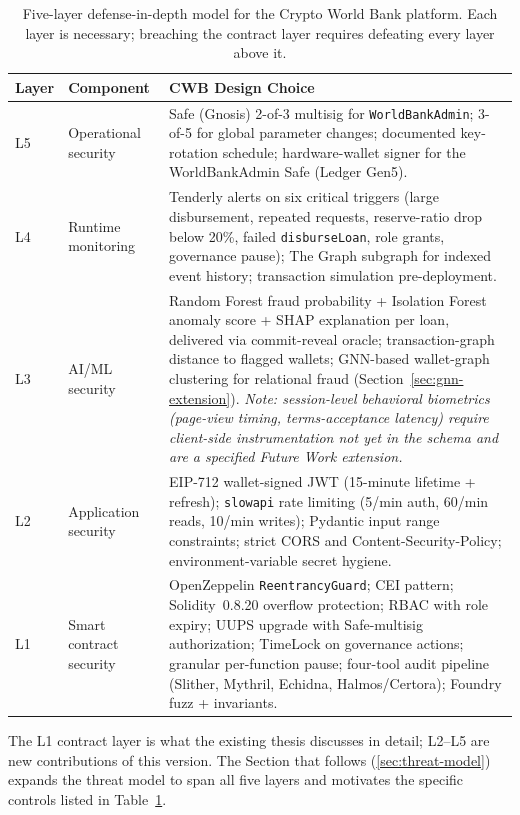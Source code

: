 \documentclass[12pt,a4paper]{report}
\begin{document}
\begin{table}[H]
\centering
\caption{Five-layer defense-in-depth model for the Crypto World Bank platform. Each layer is necessary; breaching the contract layer requires defeating every layer above it.}
\label{tab:defense-layers}
\begin{tabular}{p{1.4cm}p{4.0cm}p{8.5cm}}
\hline
\textbf{Layer} & \textbf{Component} & \textbf{CWB Design Choice} \\
\hline
L5 & Operational security & Safe (Gnosis) 2-of-3 multisig for \texttt{WorldBankAdmin}; 3-of-5 for global parameter changes; documented key-rotation schedule; hardware-wallet signer for the WorldBankAdmin Safe (Ledger Gen5). \\
\hline
L4 & Runtime monitoring & Tenderly alerts on six critical triggers (large disbursement, repeated requests, reserve-ratio drop below 20\%, failed \texttt{disburseLoan}, role grants, governance pause); The Graph subgraph for indexed event history; transaction simulation pre-deployment. \\
\hline
L3 & AI/ML security & Random Forest fraud probability + Isolation Forest anomaly score + SHAP explanation per loan, delivered via commit-reveal oracle; transaction-graph distance to flagged wallets; GNN-based wallet-graph clustering for relational fraud (Section~\ref{sec:gnn-extension}). \textit{Note: session-level behavioral biometrics (page-view timing, terms-acceptance latency) require client-side instrumentation not yet in the schema and are a specified Future Work extension.} \\
\hline
L2 & Application security & EIP-712 wallet-signed JWT (15-minute lifetime + refresh); \texttt{slowapi} rate limiting (5/min auth, 60/min reads, 10/min writes); Pydantic input range constraints; strict CORS and Content-Security-Policy; environment-variable secret hygiene. \\
\hline
L1 & Smart contract security & OpenZeppelin \texttt{ReentrancyGuard}; CEI pattern; Solidity~0.8.20 overflow protection; RBAC with role expiry; UUPS upgrade with Safe-multisig authorization; TimeLock on governance actions; granular per-function pause; four-tool audit pipeline (Slither, Mythril, Echidna, Halmos/Certora); Foundry fuzz + invariants. \\
\hline
\end{tabular}
\end{table}

The L1 contract layer is what the existing thesis discusses in detail; L2--L5 are new contributions of this version. The Section that follows (\ref{sec:threat-model}) expands the threat model to span all five layers and motivates the specific controls listed in Table~\ref{tab:defense-layers}.
\end{document}
